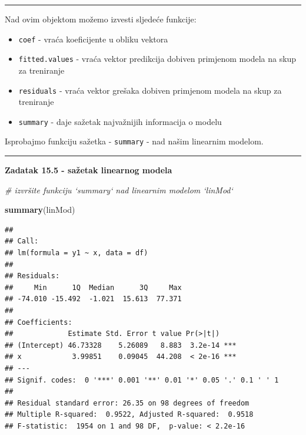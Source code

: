 \documentclass[]{book}
\newenvironment{Shaded}{\begin{snugshade}}{\end{snugshade}}
\newcommand{\KeywordTok}[1]{\textcolor[rgb]{0.13,0.29,0.53}{\textbf{#1}}}
\newcommand{\CommentTok}[1]{\textcolor[rgb]{0.56,0.35,0.01}{\textit{#1}}}
\newcommand{\NormalTok}[1]{#1}
\providecommand{\tightlist}{%
  \setlength{\itemsep}{0pt}\setlength{\parskip}{0pt}}
\theoremstyle{definition}
\theoremstyle{definition}
\theoremstyle{definition}
\theoremstyle{remark}
\begin{document}
\begin{center}\rule{0.5\linewidth}{\linethickness}\end{center}

Nad ovim objektom možemo izvesti sljedeće funkcije:

\begin{itemize}
\tightlist
\item
  \texttt{coef} - vraća koeficijente u obliku vektora
\item
  \texttt{fitted.values} - vraća vektor predikcija dobiven primjenom
  modela na skup za treniranje
\item
  \texttt{residuals} - vraća vektor grešaka dobiven primjenom modela na
  skup za treniranje
\item
  \texttt{summary} - daje sažetak najvažnijih informacija o modelu
\end{itemize}

Isprobajmo funkciju sažetka - \texttt{summary} - nad našim linearnim
modelom.

\begin{center}\rule{0.5\linewidth}{\linethickness}\end{center}

\textbf{Zadatak 15.5 - sažetak linearnog modela}

\begin{Shaded}
\begin{Highlighting}[]
\CommentTok{# izvršite funkciju `summary` nad linearnim modelom `linMod`}
\end{Highlighting}
\end{Shaded}

\begin{Shaded}
\begin{Highlighting}[]
\KeywordTok{summary}\NormalTok{(linMod)}
\end{Highlighting}
\end{Shaded}

\begin{verbatim}
## 
## Call:
## lm(formula = y1 ~ x, data = df)
## 
## Residuals:
##     Min      1Q  Median      3Q     Max 
## -74.010 -15.492  -1.021  15.613  77.371 
## 
## Coefficients:
##             Estimate Std. Error t value Pr(>|t|)    
## (Intercept) 46.73328    5.26089   8.883  3.2e-14 ***
## x            3.99851    0.09045  44.208  < 2e-16 ***
## ---
## Signif. codes:  0 '***' 0.001 '**' 0.01 '*' 0.05 '.' 0.1 ' ' 1
## 
## Residual standard error: 26.35 on 98 degrees of freedom
## Multiple R-squared:  0.9522, Adjusted R-squared:  0.9518 
## F-statistic:  1954 on 1 and 98 DF,  p-value: < 2.2e-16
\end{verbatim}
\end{document}
